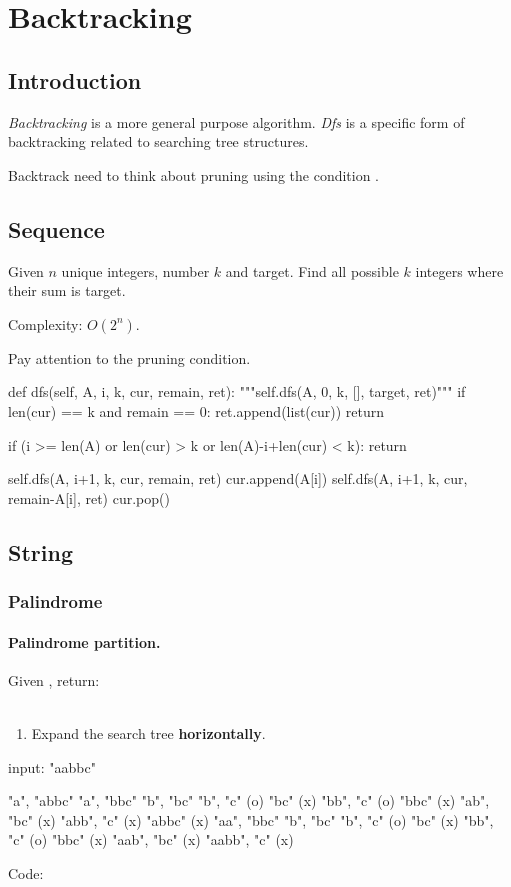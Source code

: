 \chapter{Backtracking}
\section{Introduction}
 \textit{Backtracking} is a more general purpose algorithm. \textit{Dfs} is a specific form of backtracking related to searching tree structures. 

 Backtrack need to think about pruning using the condition .

\section{Sequence}
 Given $n$ unique integers, number $k$ and target. Find all possible $k$ integers where their sum is target. 

Complexity: $O(2^n)$.

Pay attention to the pruning condition.

\begin{python}
def dfs(self, A, i, k, cur, remain, ret):
    """self.dfs(A, 0, k, [], target, ret)"""
    if len(cur) == k and remain == 0:
        ret.append(list(cur))
        return

    if (i >= len(A) or len(cur) > k 
        or len(A)-i+len(cur) < k):
        return

    self.dfs(A, i+1, k, cur, remain, ret)
    cur.append(A[i])
    self.dfs(A, i+1, k, cur, remain-A[i], ret)
    cur.pop()
\end{python}


\section{String}
\subsection{Palindrome}
\subsubsection{Palindrome partition.} Given , return: \\
\pyinline{[["aa","b"], ["a","a","b"]]}
\\
\begin{enumerate}
\item Expand the search tree \textbf{horizontally}.
\end{enumerate}
\begin{python}
input: "aabbc"

"a", "abbc"
     "a", "bbc"
          "b", "bc"
               "b", "c" (o)
               "bc" (x)
          "bb", "c" (o)
          "bbc" (x)
     "ab", "bc" (x)
     "abb", "c" (x)
     "abbc" (x)
"aa", "bbc"
      "b", "bc"
           "b", "c" (o)
           "bc" (x)
      "bb", "c" (o)
      "bbc" (x)
"aab", "bc" (x)
"aabb", "c" (x)
\end{python}
Code:


